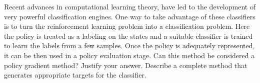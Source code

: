 \documentclass[addpoints,12pt,solution]{exam}
\begin{document}
\begin{questions}
\begin{solution}
        \end{solution}

        \question[5] [PG] Recent advances in computational learning theory, have led to the development of very powerful classification engines. One way to take advantage of these classifiers is to turn the reinforcement learning problem into a classification problem. Here the policy is treated as a labeling on the states and a suitable classifier is trained to learn the labels from a few samples. Once the policy is adequately represented, it can be then used in a policy evaluation stage. Can this method be considered a policy gradient method? Justify your answer. Describe a complete method that generates appropriate targets for the classifier.
        \begin{solution}

        \end{solution}

    \end{questions}
\end{document}
